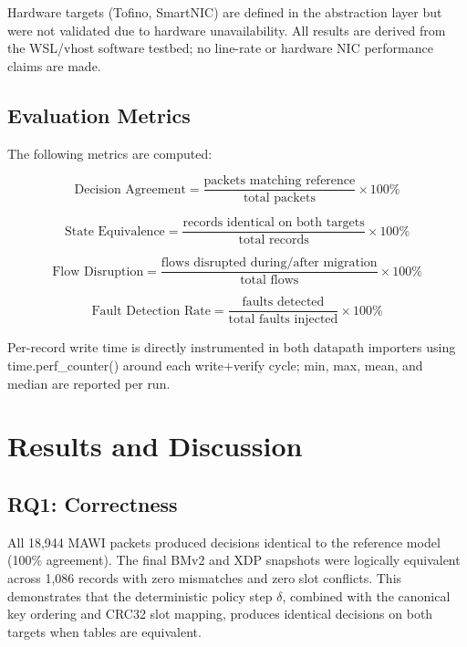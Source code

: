 \documentclass[10pt, conference]{IEEEtran}
\begin{document}
Hardware targets (Tofino, SmartNIC) are defined in the abstraction layer but were not validated due to hardware unavailability. All results are derived from the WSL/vhost software testbed; no line-rate or hardware NIC performance claims are made.

\subsection{Evaluation Metrics}
\label{subsec:metrics}
The following metrics are computed:

\begin{equation}
    \text{Decision Agreement} =
    \frac{\text{packets matching reference}}{\text{total packets}} \times 100\%
\label{eq:decision_agreement}
\end{equation}

\begin{equation}
    \text{State Equivalence} =
    \frac{\text{records identical on both targets}}{\text{total records}}
    \times 100\%
\label{eq:state_equivalence}
\end{equation}

\begin{equation}
    \text{Flow Disruption} =
    \frac{\text{flows disrupted during/after migration}}{\text{total flows}}
    \times 100\%
\label{eq:flow_disruption}
\end{equation}

\begin{equation}
    \text{Fault Detection Rate} =
    \frac{\text{faults detected}}{\text{total faults injected}} \times 100\%
\label{eq:fault_detection}
\end{equation}

Per-record write time is directly instrumented in both datapath importers using time.perf\_counter() around each write+verify cycle; min, max, mean, and median are reported per run.

\section{Results and Discussion}
\label{sec:results}

\subsection{RQ1: Correctness}
\label{subsec:rq1}
All 18{,}944 MAWI packets produced decisions identical to the reference model (100\% agreement). The final BMv2 and XDP snapshots were logically equivalent across 1{,}086 records with zero mismatches and zero slot conflicts. This demonstrates that the deterministic policy step $\delta$, combined with the canonical key ordering and CRC32 slot mapping, produces identical decisions on both targets when tables are equivalent.
\end{document}
